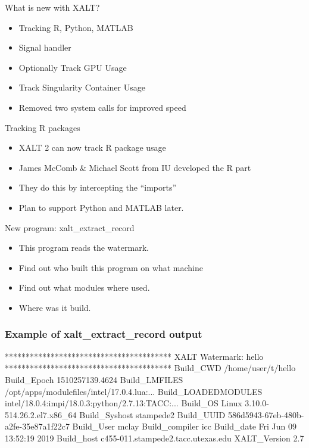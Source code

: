 \documentclass{beamer}
\begin{document}
\begin{frame}{What is new with XALT?}
  \begin{itemize}
    \item Tracking R, Python, MATLAB
    \item Signal handler
    \item Optionally Track GPU Usage
    \item Track Singularity Container Usage
    \item Removed two system calls for improved speed
  \end{itemize}
\end{frame}

\begin{frame}{Tracking R packages}
  \begin{itemize}
    \item XALT 2 can now track R package usage
    \item James McComb \& Michael Scott from IU developed the R part
    \item They do this by intercepting the ``imports''
    \item Plan to support Python and MATLAB later.
  \end{itemize}
\end{frame}

\begin{frame}{New program: xalt\_extract\_record}
  \begin{itemize}
    \item This program reads the watermark.
    \item Find out who built this program on what machine
    \item Find out what modules where used.
    \item Where was it build. 
  \end{itemize}
\end{frame}

\begin{frame}[fragile]
    \frametitle{Example of xalt\_extract\_record output}
 {\small
    \begin{semiverbatim}
****************************************
XALT Watermark: hello
****************************************
Build\_CWD                /home/user/t/hello
Build\_Epoch              1510257139.4624
Build\_LMFILES            /opt/apps/modulefiles/intel/17.0.4.lua:...
Build\_LOADEDMODULES      intel/18.0.4:impi/18.0.3:python/2.7.13:TACC:...
Build\_OS                 Linux 3.10.0-514.26.2.el7.x86_64
Build\_Syshost            stampede2
Build\_UUID               586d5943-67eb-480b-a2fe-35e87a1f22c7
Build\_User               mclay
Build\_compiler           icc
Build\_date               Fri Jun 09 13:52:19 2019
Build\_host               c455-011.stampede2.tacc.utexas.edu
XALT\_Version             2.7
    \end{semiverbatim}
}
\end{frame}
\end{document}
